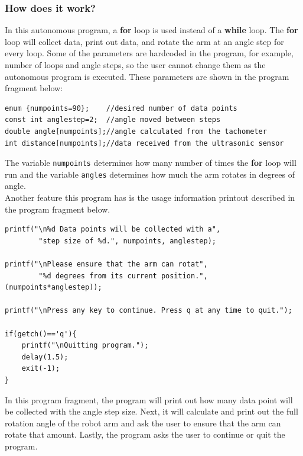 \documentclass[11pt]{article}
\begin{document}
\subsubsection*{How does it work?}
In this autonomous program, a {\bf for} loop is used instead of a {\bf while} 
loop. The {\bf for} loop will collect data, print out data, and rotate the arm 
at an angle step for every loop. Some of the parameters are hardcoded in the 
program, for example, number of loops and angle steps, so the user cannot change 
them as the autonomous program is executed. These parameters are shown in the 
program fragment below:
\begin{lstlisting}
enum {numpoints=90};    //desired number of data points
const int anglestep=2;	//angle moved between steps
double angle[numpoints];//angle calculated from the tachometer
int distance[numpoints];//data received from the ultrasonic sensor
\end{lstlisting}
The variable {\tt numpoints} determines how many number of times the {\bf for} 
loop will run and the variable {\tt angles} determines how much the arm rotates 
in degrees of angle.\\

Another feature this program has is the usage information printout described in 
the program fragment below.
\begin{lstlisting}
printf("\n%d Data points will be collected with a",
        "step size of %d.", numpoints, anglestep);

printf("\nPlease ensure that the arm can rotat",
        "%d degrees from its current position.",(numpoints*anglestep));

printf("\nPress any key to continue. Press q at any time to quit.");

if(getch()=='q'){
    printf("\nQuitting program.");
    delay(1.5);
    exit(-1);
}
\end{lstlisting}
In this program fragment, the program will print out how many data point will 
be collected with the angle step size. Next, it will calculate and print out 
the full rotation angle of the robot arm and ask the user to ensure that the 
arm can rotate that amount. Lastly, the program asks the user to 
continue or quit the program.
\end{document}
